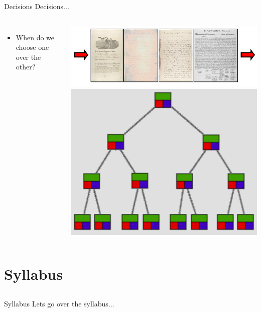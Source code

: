\documentclass{beamer}
\begin{document}
\begin{frame}{Decisions Decisions...}
\begin{columns}[c]
\begin{itemize}
\item When do we choose one over the other?
\end{itemize}
\includegraphics[width=1.0\textwidth]{../imgs/queue.png}
\includegraphics[width=1.0\textwidth]{../imgs/binary-tree-color.png}
\end{columns}
\end{frame}

\section{Syllabus}
\subsection{}

\begin{frame}{Syllabus}
Lets go over the syllabus...
\end{frame}
\end{document}
